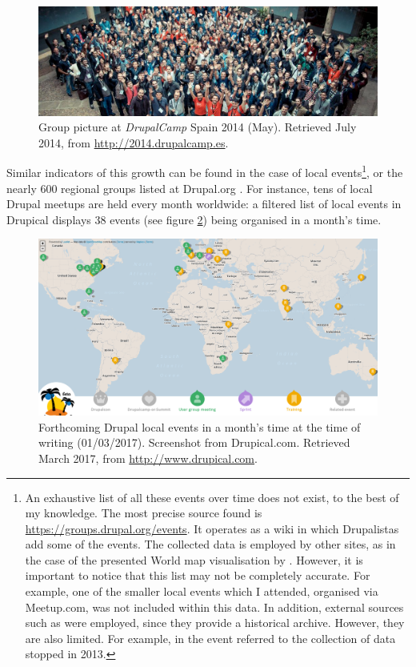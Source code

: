 \begin{figure}[H]
	\centering
	\includegraphics[scale=0.37]{img/events/drupalcamp_spain.jpg}
	\caption[\textit{DrupalCamp} Spain 2014]%
    {Group picture at \textit{DrupalCamp} Spain 2014 (May). Retrieved  July 2014, from \url{http://2014.drupalcamp.es}.}
	\label{drupalcamp-spain-2014}
\end{figure}

Similar indicators of this growth can be found in the case of local events\footnote{An exhaustive list of all these events over time does not exist, to the best of my knowledge. The most precise source found is \url{https://groups.drupal.org/events}. It operates as a wiki in which Drupalistas add some of the events. The collected data is employed by other sites, as in the case of the presented World map visualisation by \textcite{drupical:2016:Online}. However, it is important to notice that this list may not be completely accurate. For example, one of the smaller local events which I attended, organised via Meetup.com, was not included within this data. In addition, external sources such as \textcite{ostraining-list-drupalcamps:2016:Online} were employed, since they provide a historical archive. However, they are also limited. For example, in the event referred to the collection of data stopped in 2013.}, or the nearly 600 regional groups listed at Drupal.org \parencite{drupalorg-groups:2016:Online}. For instance, tens of local Drupal meetups are held every month worldwide: a filtered list of local events in Drupical \parencite{drupical:2016:Online} displays 38 events (see figure \ref{drupical-local-events}) being organised in a month's time. 

\begin{figure}[H]
	\centering
	\includegraphics[scale=0.25]{img/offline/drupical_march_2017}
	\caption[World map of Drupal local events]%
    {Forthcoming Drupal local events in a month's time at the time of writing (01/03/2017). Screenshot from Drupical.com. Retrieved  March 2017, from \url{http://www.drupical.com}.}
	\label{drupical-local-events}
\end{figure}

